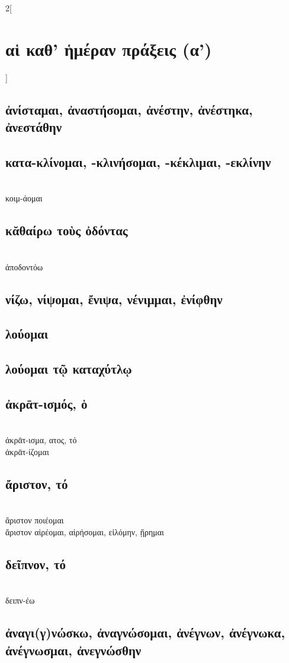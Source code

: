 \documentclass{book}
\begin{document}
\begin{multicols}{2}[\section{αἱ καθ' ἡμέραν πράξεις (α')}]
\subsection{ἀνίσταμαι, ἀναστήσομαι, ἀνέστην, ἀνέστηκα, ἀνεστάθην}
\subsection{κατα-κλίνομαι, -κλινήσομαι, -κέκλιμαι, -εκλίνην}
 ~\\
κοιμ-άομαι 
\subsection{κᾰθαίρω τοὺς ὀδόντας}  ~\\
ἀποδοντόω 
\subsection{νίζω, νίψομαι, ἔνιψα, νένιμμαι, ἐνίφθην} 
\subsection{λούομαι} 
\subsection{λούομαι τῷ καταχύτλῳ} 
\subsection{ἀκρᾱτ-ισμός, ὁ}  ~\\
ἀκρᾱτ-ισμα, ατος, τό  ~\\
ἀκρᾱτ-ίζομαι 
\subsection{ἄριστον, τό}  ~\\
ἄριστον ποιέομαι   ~\\
ἄριστον αἱρέομαι, αἱρήσομαι, εἱλόμην, ᾕρημαι   
\subsection{δεῖπνον, τό}  ~\\
δειπν-έω 
\subsection{ἀναγι(γ)νώσκω, ἀναγνώσομαι, ἀνέγνων, ἀνέγνωκα, ἀνέγνωσμαι, ἀνεγνώσθην} 
~
\end{multicols}
\end{document}
